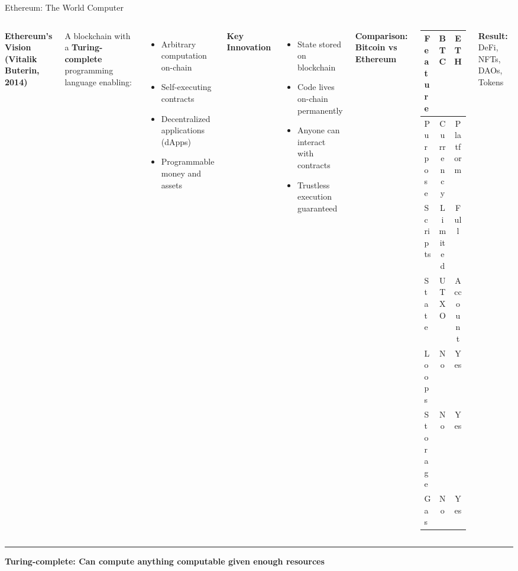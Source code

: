 \documentclass[8pt,aspectratio=169]{beamer}
\newcommand{\bottomnote}[1]{%
\vfill
\vspace{-2mm}
\textcolor{mllavender2}{\rule{\textwidth}{0.4pt}}
\vspace{1mm}
\footnotesize
\textbf{#1}
}
\begin{document}
\begin{frame}[t]{Ethereum: The World Computer}
\begin{columns}[T]
\textbf{Ethereum's Vision (Vitalik Buterin, 2014)}

A blockchain with a \textbf{Turing-complete} programming language enabling:

\begin{itemize}
\item Arbitrary computation on-chain
\item Self-executing contracts
\item Decentralized applications (dApps)
\item Programmable money and assets
\end{itemize}

\vspace{0.5em}
\textbf{Key Innovation}
\begin{itemize}
\item State stored on blockchain
\item Code lives on-chain permanently
\item Anyone can interact with contracts
\item Trustless execution guaranteed
\end{itemize}

\textbf{Comparison: Bitcoin vs Ethereum}

\begin{center}
\begin{tabular}{lcc}
\toprule
\textbf{Feature} & \textbf{BTC} & \textbf{ETH} \\
\midrule
Purpose & Currency & Platform \\
Scripts & Limited & Full \\
State & UTXO & Account \\
Loops & No & Yes \\
Storage & No & Yes \\
Gas & No & Yes \\
\bottomrule
\end{tabular}
\end{center}

\vspace{0.5em}
\textbf{Result:} DeFi, NFTs, DAOs, Tokens
\end{columns}

\bottomnote{Turing-complete: Can compute anything computable given enough resources}
\end{frame}
\end{document}
